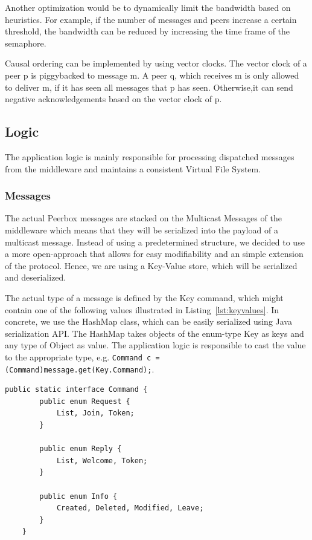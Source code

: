 Another optimization would be to dynamically limit the bandwidth based on heuristics. For example, if the number of messages and peers increase a certain threshold, the bandwidth can be reduced by increasing the time frame of the semaphore. 

Causal ordering can be implemented by using vector clocks. The vector clock of a peer p is piggybacked to message m. A peer q, which receives m is only allowed to deliver m, if it has seen all messages that p has seen. Otherwise,it can send negative acknowledgements based on the vector clock of p. 

\subsection{Logic}
The application logic is mainly responsible for processing dispatched messages from the middleware and maintains a consistent Virtual File System.
    
\subsubsection{Messages}   
The actual Peerbox messages are stacked on the Multicast Messages of the middleware which means that they will be serialized into the payload of a multicast message. 
Instead of using a predetermined structure, we decided to use a more open-approach that allows for easy modifiability and an simple extension of the protocol. Hence, we are using a Key-Value store, which will be serialized and deserialized. 

The actual type of a message is defined by the Key command, which might contain one of the following values illustrated in Listing~\ref{lst:keyvalues}. In concrete, we use the HashMap class, which can be easily serialized using Java serialization API.  The HashMap takes objects of the enum-type Key as keys and any type of Object as value. The application logic is responsible to cast the value to the appropriate type, e.g. \verb|Command c = (Command)message.get(Key.Command);|.

\begin{lstlisting}[caption=Possible values of command, label=lst:keyvalues]
public static interface Command {
		public enum Request {
			List, Join, Token;
		}

		public enum Reply {
			List, Welcome, Token;
		}

		public enum Info {
			Created, Deleted, Modified, Leave;
		}
	}
\end{lstlisting}


